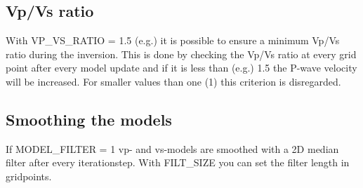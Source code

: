 \subsection{Vp/Vs ratio}
{\color{blue}{\begin{verbatim}
"Minimum Vp/Vs-ratio" : "comment",
"VP_VS_RATIO" : "1.5",
\end{verbatim}}}
{\color{red}{\begin{verbatim}
Default values are:
	VP_VS_RATIO > 1
\end{verbatim}}}
With VP\_VS\_RATIO = 1.5 (e.g.) it is possible to ensure a minimum Vp/Vs ratio during the inversion. This is done by checking the Vp/Vs ratio at every grid point after every model update and if it is less than (e.g.) 1.5 the P-wave velocity will be increased. For smaller values than one (1) this criterion is disregarded.

\subsection{Smoothing the models}
{\color{blue}{\begin{verbatim}
"Definition of smoothing the models vp and vs" : "comment",
			"MODEL_FILTER" : "0",
			"FILT_SIZE" : "5",
\end{verbatim}}}

{\color{red}{\begin{verbatim}
Default values are:
	MODEL_FILTER=0
\end{verbatim}}}

If MODEL\_FILTER = 1 vp- and vs-models are smoothed with a 2D median filter after every iterationstep. With FILT\_SIZE you can set the filter length in gridpoints.